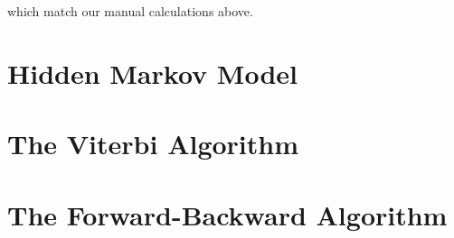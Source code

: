 \documentclass{article}
\theoremstyle{definition}
\begin{document}
which match our manual calculations above.

\pagebreak

\section{Hidden Markov Model}

\pagebreak

\section{The Viterbi Algorithm}

\pagebreak

\section{The Forward-Backward Algorithm}
\end{document}
